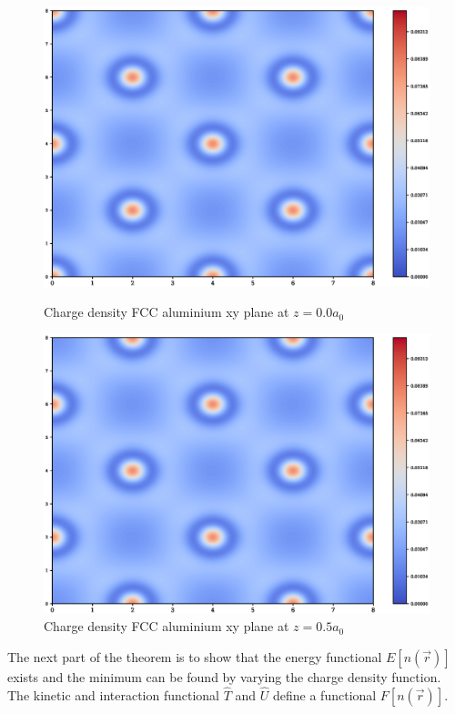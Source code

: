 \FloatBarrier
\begin{figure}[!htb]
\includegraphics[width=\linewidth]{chapters/interatomic_potential_fitting/images/layer0000.eps}
\caption{Charge density FCC aluminium xy plane at $z=0.0 a_0$}
\label{fig:cdalfcc1}
\endminipage\hfill
{}
\includegraphics[width=\linewidth]{chapters/interatomic_potential_fitting/images/layer0050.eps}
\caption{Charge density FCC aluminium xy plane at $z=0.5 a_0$}
\label{fig:cdalfcc2}
\endminipage
\end{figure}


The next part of the theorem is to show that the energy functional $E[n(\vec{r})]$ exists and the minimum can be found by varying the charge density function.  The kinetic and interaction functional $\hat{T}$ and $\hat{U}$ define a functional $F[n(\vec{r})]$.

